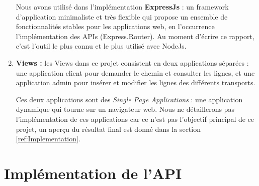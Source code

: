 \begin{enumerate}
	      Nous avons utilisé dans l'implémentation \textbf{ExpressJs} : un framework d'application minimaliste et très flexible qui propose un ensemble de fonctionnalités stables pour les applications web, en l'occurrence l'implémentation des APIs (Express.Router). Au moment d'écrire ce rapport, c'est l'outil le plus connu et le plus utilisé avec NodeJs.
	      	
	\item \textbf{Views :} les Views dans ce projet consistent en deux applications séparées : une application client pour demander le chemin et consulter les lignes, et une application admin pour insérer et modifier les lignes des différents transports.
	      
	      Ces deux applications sont des \emph{Single Page Applications} : une application dynamique qui tourne sur un navigateur web.
	      Nous ne détaillerons pas l'implémentation de ces applications car ce n'est pas l'objectif principal de ce projet, un aperçu du résultat final est donné dans la section \ref{ref:Implementation}.
\end{enumerate}
	
	
	
\section{Implémentation de l'API}
\label{ref:API}
